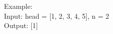 \documentclass[preview]{standalone}
\begin{document}
Example:\\Input: head = [1, 2, 3, 4, 5], n = 2\\Output: [1]\\
\end{document}
